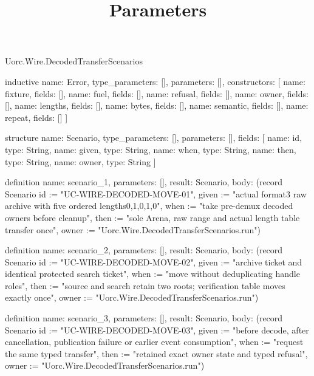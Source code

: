 \begin{lexlean}{Uorc.Wire.DecodedTransferScenarios}
\title{Parameters}
\begin{semanticmodule}
inductive{
  name: Error,
  type_parameters: [],
  parameters: [],
  constructors: [
    {name: fixture, fields: []},
    {name: fuel, fields: []},
    {name: refusal, fields: []},
    {name: owner, fields: []},
    {name: lengths, fields: []},
    {name: bytes, fields: []},
    {name: semantic, fields: []},
    {name: repeat, fields: []}
  ]
}

structure{
  name: Scenario,
  type_parameters: [],
  parameters: [],
  fields: [
    {name: id, type: String},
    {name: given, type: String},
    {name: when, type: String},
    {name: then, type: String},
    {name: owner, type: String}
  ]
}

definition{
  name: scenario_1,
  parameters: [],
  result: Scenario,
  body: (record Scenario {id := "UC-WIRE-DECODED-MOVE-01", given := "actual format3 raw archive with five ordered lengths0,1,0,1,0", when := "take pre-demux decoded owners before cleanup", then := "sole Arena, raw range and actual length table transfer once", owner := "Uorc.Wire.DecodedTransferScenarios.run"})
}

definition{
  name: scenario_2,
  parameters: [],
  result: Scenario,
  body: (record Scenario {id := "UC-WIRE-DECODED-MOVE-02", given := "archive ticket and identical protected search ticket", when := "move without deduplicating handle roles", then := "source and search retain two roots; verification table moves exactly once", owner := "Uorc.Wire.DecodedTransferScenarios.run"})
}

definition{
  name: scenario_3,
  parameters: [],
  result: Scenario,
  body: (record Scenario {id := "UC-WIRE-DECODED-MOVE-03", given := "before decode, after cancellation, publication failure or earlier event consumption", when := "request the same typed transfer", then := "retained exact owner state and typed refusal", owner := "Uorc.Wire.DecodedTransferScenarios.run"})
}


\end{semanticmodule}
\end{lexlean}
